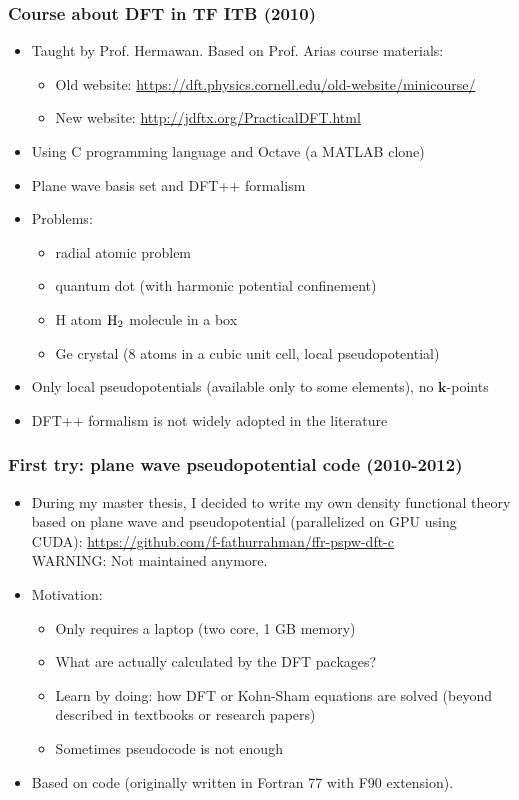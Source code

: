 \begin{frame}
\frametitle{Course about DFT in TF ITB (2010)}

\begin{itemize}
\item Taught by Prof. Hermawan. Based on Prof. Arias course materials:
  \begin{itemize}
  \item Old website: {\footnotesize\url{https://dft.physics.cornell.edu/old-website/minicourse/}}
  \item New website: {\footnotesize\url{http://jdftx.org/PracticalDFT.html}}
  \end{itemize}
\item Using C programming language and Octave (a MATLAB clone)
\item Plane wave basis set and DFT++ formalism
\item Problems:
  \begin{itemize}
  \item radial atomic problem
  \item quantum dot (with harmonic potential confinement)
  \item H atom $\ce{H2}$ molecule in a box
  \item Ge crystal (8 atoms in a cubic unit cell, local pseudopotential)
  \end{itemize}
\item Only local pseudopotentials (available only to some elements), no $\mathbf{k}$-points
\item DFT++ formalism is not widely adopted in the literature
\end{itemize}

\end{frame}


\begin{frame}
\frametitle{First try: plane wave pseudopotential code (2010-2012)}

\begin{itemize}
\item During my master thesis, I decided to write my own density functional theory
based on plane wave and pseudopotential (parallelized on GPU using CUDA):
{\footnotesize\url{https://github.com/f-fathurrahman/ffr-pspw-dft-c}} \\
WARNING: Not maintained anymore.
\item Motivation:
  \begin{itemize}
  \item Only requires a laptop (two core, 1 GB memory)
  \item What are actually calculated by the DFT packages?
  \item Learn by doing: how DFT or Kohn-Sham equations are solved (beyond described in
  textbooks or research papers)
  \item Sometimes pseudocode is not enough
  \end{itemize}
\item Based on  code (originally written in Fortran 77 with  F90 extension).
\end{itemize}

\end{frame}


